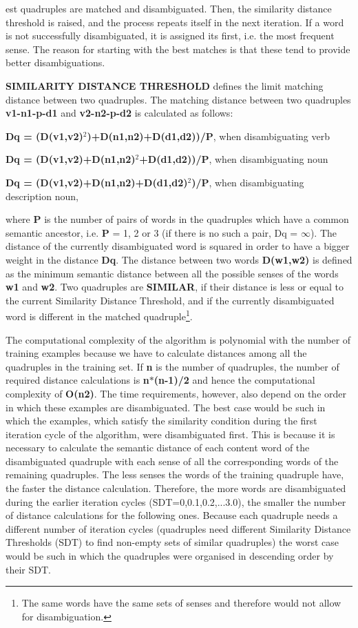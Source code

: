 \noindent est quadruples are matched and disambiguated. Then, the similarity distance threshold is raised, and the process repeats itself in the next iteration. If a word is not successfully disambiguated, it is assigned its first, i.e. the most frequent sense. The reason for starting with the best matches is that these tend to provide better disambiguations.

{\bf SIMILARITY DISTANCE THRESHOLD} defines the limit matching distance between two quadruples. The matching distance between two quadruples {\bf v1-n1-p-d1} and {\bf v2-n2-p-d2} is calculated as follows:

\begin{center}
{\bf Dq = (D(v1,v2)$^{2}$)+D(n1,n2)+D(d1,d2))/P}, when disambiguating verb

{\bf Dq = (D(v1,v2)+D(n1,n2)$^{2}$+D(d1,d2))/P}, when disambiguating noun

{\bf Dq = (D(v1,v2)+D(n1,n2)+D(d1,d2)$^2$)/P}, when disambiguating description
noun,\end{center}

\noindent
where {\bf P} is the number of pairs of words in the quadruples which have a common semantic ancestor, i.e. {\bf P} = 1, 2 or 3 (if there is no such a pair, Dq = $\infty$). The distance of the currently disambiguated word is squared in order to have a bigger weight in the distance {\bf Dq}. The distance between two words {\bf D(w1,w2)} is defined as the minimum semantic distance between all the possible senses of the words {\bf w1} and {\bf w2}. Two quadruples are {\bf SIMILAR}, if their distance is less or equal to the current Similarity Distance Threshold, and if the currently disambiguated word is different in the matched quadruple\footnote{The same words have the same sets of senses and therefore would not allow for disambiguation.}. 

The computational complexity of the algorithm is polynomial with the number of training examples because we have to calculate distances among all the quadruples in the training set. If {\bf n} is the number of quadruples, the number of required distance calculations is {\bf n$*$(n-1)/2} and hence the computational complexity of {\bf O(n2)}. The time requirements, however, also depend on the order in which these examples are disambiguated. The best case would be such in which the examples, which satisfy the similarity condition during the first iteration cycle of the algorithm, were disambiguated first. This is because it is necessary to calculate the semantic distance of each content word of the disambiguated quadruple with each sense of all the corresponding words of the remaining quadruples. The less senses the words of the training quadruple have, the faster the distance calculation. Therefore, the more words are disambiguated during the earlier iteration cycles (SDT=0,0.1,0.2,...3.0), the smaller the number of distance calculations for the following ones.\hspace{-0.4mm} Because each quadruple needs a different number of iteration cycles (quadruples need different Similarity Distance Thresholds (SDT) to find non-empty sets of similar quadruples) the worst case would be such in which the quadruples were organised in descending order by their SDT.

